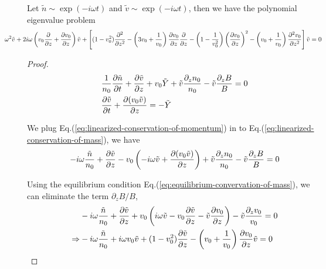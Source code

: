 \begin{proposition}
	Let $\tilde{n}\sim \exp(-i\omega t)$ and $\tilde{v} \sim \exp(-i\omega t)$, then we have the polynomial eigenvalue problem
	\begin{equation}
		\hspace{-0.5in}
		\omega^2 \tilde{v} 
		+ 2i\omega\left(v_0\pdv{}{z} + \pdv{v_0}{z}\right) \tilde{v} 
		+ \left[ (1-v_0^2)\pdv[2]{}{z} 
		-\left(3v_0 + \frac{1}{v_0}\right)\pdv{v_0}{z}\pdv{}{z} 
		- \left(1-\frac{1}{v_0^2}\right)\left(\pdv{v_0}{z}\right)^2 
		- \left(v_0+\frac{1}{v_0}\right)\pdv[2]{v_0}{z} \right]\tilde{v}
		= 0
		\label{eq:polynomial_eigenvalue_problem}
	\end{equation}
\end{proposition}
\begin{proof}
	\begin{align*}
		&\frac{1}{n_0}\pdv{\tilde{n}}{t} 
		+ \pdv{\tilde{v}}{z} + v_0\tilde{Y} + \tilde{v}\frac{\partial_z n_0}{n_0} - \tilde{v}\frac{\partial_z B}{B} = 0 
		\\
		&\pdv{\tilde{v}}{t} + \pdv{(v_0\tilde{v})}{z} = -\tilde{Y}
	\end{align*}
	
	
	We plug Eq.(\ref{eq:linearized-conservation-of-momentum}) in to Eq.(\ref{eq:linearized-conservation-of-mass}), we have 
	\[ -i\omega\frac{\tilde{n}}{n_0} 
	+ \pdv{\tilde{v}}{z} - v_0\left(-i\omega\tilde{v} + \pdv{(v_0\tilde{v})}{z}\right) + \tilde{v}\frac{\partial_z n_0}{n_0} - \tilde{v}\frac{\partial_z B}{B} = 0 \]
	
	Using the equilibrium condition Eq.(\ref{eq:equilibrium-convervation-of-mass}), we can eliminate the term $\partial_z B/B$,
	\begin{align*}
		&-i\omega\frac{\tilde{n}}{n_0} 
		+ \pdv{\tilde{v}}{z} 
		+ v_0\left(i\omega \tilde{v} - v_0\pdv{\tilde{v}}{z} - \tilde{v}\pdv{v_0}{z} \right)
		- \tilde{v}\frac{\partial_z v_0}{v_0} = 0\\
		\Rightarrow
		&-i\omega\frac{\tilde{n}}{n_0} 
		+ i\omega v_0\tilde{v}
		+ (1-v_0^2)\pdv{\tilde{v}}{z} 
		- \left(v_0+\frac{1}{v_0}\right)\pdv{v_0}{z}\tilde{v} = 0
	\end{align*}
	

\end{proof}
